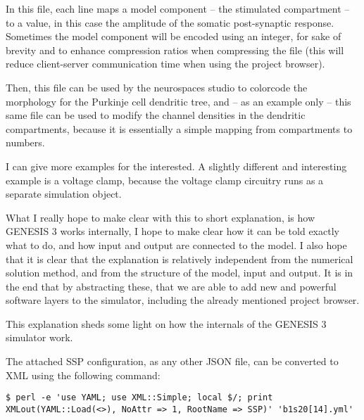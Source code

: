 \documentclass[12pt]{article}
\begin{document}
\begin{enumerate}
  In this file, each line maps a model component -- the stimulated
  compartment -- to a value, in this case the amplitude of the somatic
  post-synaptic response.  Sometimes the model component will be
  encoded using an integer, for sake of brevity and to enhance
  compression ratios when compressing the file (this will reduce
  client-server communication time when using the project browser).

  Then, this file can be used by the neurospaces studio to colorcode
  the morphology for the Purkinje cell dendritic tree, and -- as an
  example only -- this same file can be used to modify the channel
  densities in the dendritic compartments, because it is essentially a
  simple mapping from compartments to numbers.

  I can give more examples for the interested.  A slightly different
  and interesting example is a voltage clamp, because the voltage
  clamp circuitry runs as a separate simulation object.

  What I really hope to make clear with this to short explanation, is
  how GENESIS 3 works internally, I hope to make clear how it can be
  told exactly what to do, and how input and output are connected to
  the model.  I also hope that it is clear that the explanation is
  relatively independent from the numerical solution method, and from
  the structure of the model, input and output.  It is in the end that
  by abstracting these, that we are able to add new and powerful
  software layers to the simulator, including the already mentioned
  project browser.
\end{enumerate}

This explanation sheds some light on how the internals of the GENESIS
3 simulator work.

The attached SSP configuration, as any other JSON file, can be
converted to XML using the following command:

\begin{verbatim}
$ perl -e 'use YAML; use XML::Simple; local $/; print
XMLout(YAML::Load(<>), NoAttr => 1, RootName => SSP)' 'b1s20[14].yml'
\end{verbatim}
\end{document}
